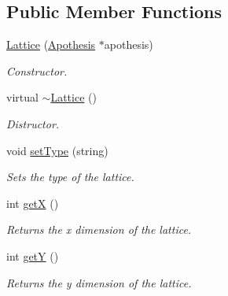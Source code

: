 \subsection*{Public Member Functions}
\begin{DoxyCompactItemize}
\item 
\mbox{\label{classLattice_a2a692cb14beaf2833c7997ff1adbca97}} 
\mbox{\hyperlink{classLattice_a2a692cb14beaf2833c7997ff1adbca97}{Lattice}} (\mbox{\hyperlink{classApothesis}{Apothesis}} $\ast$apothesis)
\begin{DoxyCompactList}\small\item\em Constructor. \end{DoxyCompactList}\item 
\mbox{\label{classLattice_a91be54ce9927b6bc53d30a2faf760780}} 
virtual \mbox{\hyperlink{classLattice_a91be54ce9927b6bc53d30a2faf760780}{$\sim$\+Lattice}} ()
\begin{DoxyCompactList}\small\item\em Distructor. \end{DoxyCompactList}\item 
\mbox{\label{classLattice_a89814b38f15333f57e88ce4321f0796f}} 
void \mbox{\hyperlink{classLattice_a89814b38f15333f57e88ce4321f0796f}{set\+Type}} (string)
\begin{DoxyCompactList}\small\item\em Sets the type of the lattice. \end{DoxyCompactList}\item 
\mbox{\label{classLattice_a089ba222dac9bfac95cc4142d9886a9b}} 
int \mbox{\hyperlink{classLattice_a089ba222dac9bfac95cc4142d9886a9b}{getX}} ()
\begin{DoxyCompactList}\small\item\em Returns the x dimension of the lattice. \end{DoxyCompactList}\item 
\mbox{\label{classLattice_ae49e9c8208141bd28c2dcf12b93f3db1}} 
int \mbox{\hyperlink{classLattice_ae49e9c8208141bd28c2dcf12b93f3db1}{getY}} ()
\begin{DoxyCompactList}\small\item\em Returns the y dimension of the lattice. \end{DoxyCompactList}\item 

\end{DoxyCompactItemize}
